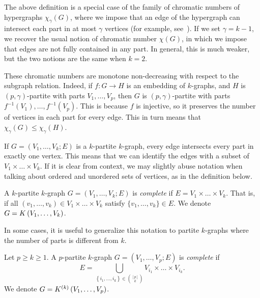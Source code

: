 The above definition is a special case of the family of chromatic numbers of hypergraphs $\chi_{\gamma}(G)$,
where we impose that an edge of the hypergraph can intersect each part in at most $\gamma$ vertices
(for example, see~\cite{krivelevich1998chromatic}).
If we set $\gamma = k - 1$, we recover the usual notion of chromatic number $\chi(G)$,
in which we impose that edges are not fully contained in any part.
In general, this is much weaker, but the two notions are the same when $k = 2$.

\begin{remark}
    These chromatic numbers are monotone non-decreasing with respect to the subgraph relation.
    Indeed, if $f: G \to H$ is an embedding of $k$-graphs,
    and $H$ is $(p, \gamma)$-partite with parts $V_1, \dots, V_p$,
    then $G$ is $(p, \gamma)$-partite with parts $f^{-1}(V_1), \dots, f^{-1}(V_p)$.
    This is because $f$ is injective, so it preserves the number of vertices in each part for every edge.
    This in turn means that $\chi_{\gamma}(G) \leq \chi_{\gamma}(H)$.
\end{remark}

If $G = (V_1, \dots, V_k; E)$ is a $k$-partite $k$-graph,
every edge intersects every part in exactly one vertex.
This means that we can identify the edges with a subset of $ V_1 \times \dots \times V_k$.
If it is clear from context, we may slightly abuse notation when talking about ordered and
unordered sets of vertices, as in the definition below.


\begin{definition} \label{def:complete_kpartite}
    A $k$-partite $k$-graph $G = (V_1, \dots, V_k; E)$ is \emph{complete}
    if $E = V_1 \times \dots \times V_k$.
    That is, if all $(v_1, \dots, v_k) \in V_1 \times \dots \times V_k$
    satisfy $\{v_1, \dots, v_k\} \in E$.
    We denote $G = K\left(V_1, \dots, V_k\right)$.
\end{definition}

In some cases, it is useful to generalize this notation to partite $k$-graphs
where the number of parts is different from $k$.

\begin{definition}
    Let $p \geq k \geq 1$.
    A $p$-partite $k$-graph $G = (V_1, \dots, V_p; E)$ is \emph{complete} if
    \[
        E = \bigcup_{\left\{i_1, \dots, i_k \right\} \in \binom{[p]}{k}} V_{i_1} \times \dots \times V_{i_k}.
    \]
    We denote $G = K^{(k)}\left(V_1, \dots, V_p\right)$.

\end{definition}

